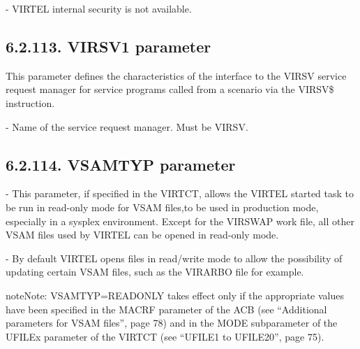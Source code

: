 \documentclass[letterpaper,10pt,english]{sphinxmanual}
\begin{document}
 - VIRTEL internal security is not available.


\subsection{6.2.113. VIRSV1 parameter}
\label{\detokenize{Installation_Guide:virsv1-parameter}}
\begin{sphinxVerbatim}[commandchars=\\\{\}]
 
\end{sphinxVerbatim}

This parameter defines the characteristics of the interface to the VIRSV service request manager for service programs called from a scenario via the VIRSV\$ instruction.

 - Name of the service request manager. Must be VIRSV.


\subsection{6.2.114. VSAMTYP parameter}
\label{\detokenize{Installation_Guide:vsamtyp-parameter}}
\begin{sphinxVerbatim}[commandchars=\\\{\}]
 
\end{sphinxVerbatim}

 - This parameter, if specified in the VIRTCT, allows the VIRTEL started task to be run in read-only mode for VSAM files,to be used in production mode, especially in a sysplex environment. Except for the VIRSWAP work file, all other VSAM files used by VIRTEL can be opened in read-only mode.

 - By default VIRTEL opens files in read/write mode to allow the possibility of updating certain VSAM files, such as the VIRARBO file for example.

\begin{sphinxadmonition}{note}{Note:}
VSAMTYP=READONLY takes effect only if the appropriate values have been specified in the MACRF parameter of the ACB (see “Additional parameters for VSAM files”, page 78) and in the MODE subparameter of the UFILEx parameter of the VIRTCT (see “UFILE1 to UFILE20”, page 75).
\end{sphinxadmonition}
\end{document}
